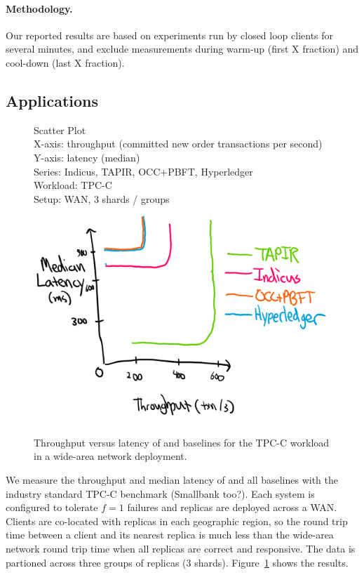 \paragraph{Methodology.} Our reported results are based on experiments run by closed loop clients for several minutes, and exclude measurements during warm-up (first X fraction) and cool-down (last X fraction).

\subsection{Applications}

\begin{figure}
  Scatter Plot\\
  X-axis: throughput (committed new order transactions per second)\\
  Y-axis: latency (median)\\
  Series: Indicus, TAPIR, OCC+PBFT, Hyperledger\\
  Workload: TPC-C\\
  Setup: WAN, 3 shards / groups\\
  \includegraphics[width=\columnwidth]{figures/eval/tpcc-tput-lat.png}
  \caption{Throughput versus latency of \sys{} and baselines for the TPC-C
  workload in a wide-area network deployment.}
  \label{fig:tpcc-tput-lat}
\end{figure}

We measure the throughput and median latency of \sys{} and all baselines with the
industry standard TPC-C benchmark (Smallbank too?). Each system is configured to tolerate $f=1$
failures and replicas are deployed across a WAN. Clients are co-located with
replicas in each geographic region, so the round trip time between a client and
its nearest replica is much less than the wide-area network round trip time when
all replicas are correct and responsive. The data is partioned across
three groups of replicas (3 shards). Figure~\ref{fig:tpcc-tput-lat} shows the results.

